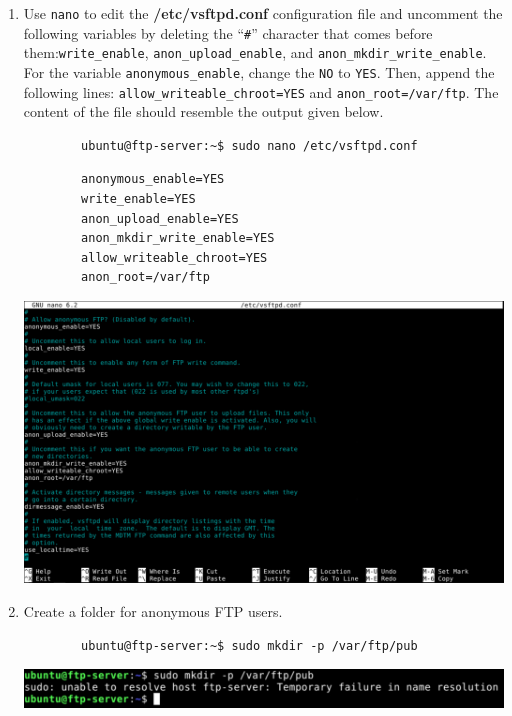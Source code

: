 \documentclass[letterpaper, 12pt]{article}
\begin{document}
\begin{enumerate}
    \item Use \texttt{nano} to edit the \textbf{/etc/vsftpd.conf} configuration file and uncomment the following
    variables by deleting the ``\texttt{\#}'' character that comes before them:\texttt{write\_enable},
    \texttt{anon\_upload\_enable}, and \texttt{anon\_mkdir\_write\_enable}. For the variable \texttt{anonymous\_enable},
    change the \texttt{NO} to \texttt{YES}. Then, append the following lines:
    \texttt{allow\_writeable\_chroot=YES} and \texttt{anon\_root=/var/ftp}. The content of the file should resemble the
    output given below.
    \begin{lstlisting}
        ubuntu@ftp-server:~$ sudo nano /etc/vsftpd.conf
    \end{lstlisting}
    \begin{lstlisting}
        anonymous_enable=YES
        write_enable=YES
        anon_upload_enable=YES
        anon_mkdir_write_enable=YES
        allow_writeable_chroot=YES
        anon_root=/var/ftp
    \end{lstlisting}

    \begin{center}
        \includegraphics[width=\linewidth]{images/part1/step44.png}
    \end{center}

    \item Create a folder for anonymous FTP users.
    \begin{lstlisting}
        ubuntu@ftp-server:~$ sudo mkdir -p /var/ftp/pub
    \end{lstlisting}

    \begin{center}
        \includegraphics[width=\linewidth]{images/part1/step45.png}
    \end{center}


\end{enumerate}
\end{document}
